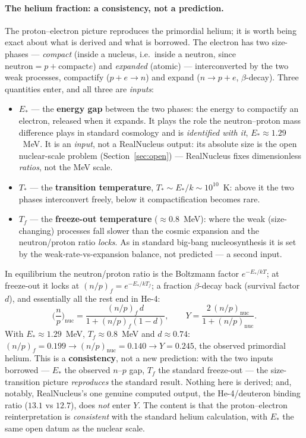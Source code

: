 \documentclass[11pt]{article}
\begin{document}
\paragraph{The helium fraction: a consistency, not a prediction.} The proton--electron picture reproduces the
primordial helium; it is worth being exact about what is derived and what is borrowed. The electron has two
size-phases --- \emph{compact} (inside a nucleus, i.e.\ inside a neutron, since $\text{neutron}=p+\text{compact
}e$) and \emph{expanded} (atomic) --- interconverted by the two weak processes, compactify ($p+e\to n$) and expand
($n\to p+e$, $\beta$-decay). Three quantities enter, and all three are \emph{inputs}:
\begin{itemize}
\item $E_\ast$ --- the \textbf{energy gap} between the two phases: the energy to compactify an electron, released
when it expands. It plays the role the neutron--proton mass difference plays in standard cosmology and is
\emph{identified with it}, $E_\ast\approx1.29$~MeV. It is an \emph{input}, not a RealNucleus output: its absolute
size is the open nuclear-scale problem (Section~\ref{sec:open}) --- RealNucleus fixes dimensionless \emph{ratios},
not the MeV scale.
\item $T_\ast$ --- the \textbf{transition temperature}, $T_\ast\sim E_\ast/k\sim10^{10}$~K: above it the two phases
interconvert freely, below it compactification becomes rare.
\item $T_f$ --- the \textbf{freeze-out temperature} ($\approx0.8$~MeV): where the weak (size-changing) processes
fall slower than the cosmic expansion and the neutron/proton ratio \emph{locks}. As in standard big-bang
nucleosynthesis it is set by the weak-rate-vs-expansion balance, not predicted --- a second input.
\end{itemize}
In equilibrium the neutron/proton ratio is the Boltzmann factor $e^{-E_\ast/kT}$; at freeze-out it locks at
$(n/p)_f=e^{-E_\ast/kT_f}$; a fraction $\beta$-decay back (survival factor $d$), and essentially all the rest end in
He-4:
\begin{equation}
\Big(\frac{n}{p}\Big)_{\text{nuc}}=\frac{(n/p)_f\,d}{1+(n/p)_f(1-d)},
\qquad
Y=\frac{2\,(n/p)_{\text{nuc}}}{1+(n/p)_{\text{nuc}}} .
\end{equation}
With $E_\ast\approx1.29$~MeV, $T_f\approx0.8$~MeV and $d\approx0.74$: $(n/p)_f=0.199\to(n/p)_{\text{nuc}}=0.140\to
Y=0.245$, the observed primordial helium. This is a \textbf{consistency}, not a new prediction: with the two inputs
borrowed --- $E_\ast$ the observed $n$--$p$ gap, $T_f$ the standard freeze-out --- the size-transition picture
\emph{reproduces} the standard result. Nothing here is derived; and, notably, RealNucleus's one genuine computed
output, the He-4/deuteron binding ratio ($13.1$ vs $12.7$), does \emph{not} enter $Y$. The content is that the
proton--electron reinterpretation is \emph{consistent} with the standard helium calculation, with $E_\ast$ the same
open datum as the nuclear scale.
\end{document}
